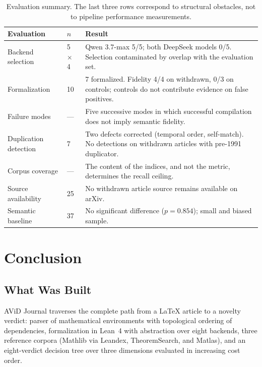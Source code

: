 \documentclass{article}
\theoremstyle{remark}
\begin{document}
\begin{table}[htbp]
\centering
\small
\setlength{\tabcolsep}{4pt}
\renewcommand{\arraystretch}{1.15}
\begin{tabular}{p{3.6cm}p{1.6cm}p{8.6cm}}
\toprule
Evaluation & $n$ & Result \\
\midrule
Backend selection & 5 $\times$ 4 & Qwen 3.7-max 5/5; both DeepSeek models 0/5. Selection contaminated by overlap with the evaluation set. \\
\addlinespace
Formalization & 10 & 7 formalized. Fidelity 4/4 on withdrawn, 0/3 on controls; controls do not contribute evidence on false positives. \\
\addlinespace
Failure modes & --- & Five successive modes in which successful compilation does not imply semantic fidelity. \\
\addlinespace
Duplication detection & 7 & Two defects corrected (temporal order, self-match). No detections on withdrawn articles with pre-1991 duplicator. \\
\addlinespace
Corpus coverage & --- & The content of the indices, and not the metric, determines the recall ceiling. \\
\addlinespace
Source availability & 25 & No withdrawn article source remains available on arXiv. \\
\addlinespace
Semantic baseline & 37 & No significant difference ($p = 0.854$); small and biased sample. \\
\bottomrule
\end{tabular}
\caption{Evaluation summary. The last three rows correspond to structural obstacles, not to pipeline performance measurements.}
\label{tab:resumen}
\end{table}


\section{Conclusion}

\label{sec:conclusion}

\subsection{What Was Built}

AViD Journal traverses the complete path from a LaTeX article to a novelty verdict: parser of mathematical environments with topological ordering of dependencies, formalization in Lean~4 with abstraction over eight backends, three reference corpora (Mathlib via Leandex, TheoremSearch, and Matlas), and an eight-verdict decision tree over three dimensions evaluated in increasing cost order.
\end{document}
